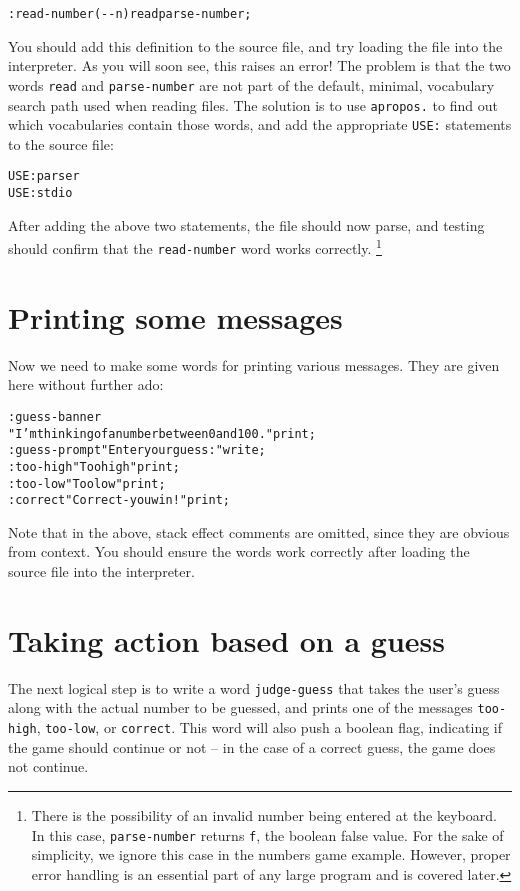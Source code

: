 \documentclass[english]{book}
\begin{document}
\begin{alltt}
: read-number ( -{}- n ) read parse-number ;
\end{alltt}
You should add this definition to the source file, and try loading
the file into the interpreter. As you will soon see, this raises an
error! The problem is that the two words \texttt{read} and \texttt{parse-number}
are not part of the default, minimal, vocabulary search path used
when reading files. The solution is to use \texttt{apropos.} to find
out which vocabularies contain those words, and add the appropriate
\texttt{USE:} statements to the source file:

\begin{alltt}
USE: parser
USE: stdio
\end{alltt}
After adding the above two statements, the file should now parse,
and testing should confirm that the \texttt{read-number} word works correctly.%
\footnote{There is the possibility of an invalid number being entered at the
keyboard. In this case, \texttt{parse-number} returns \texttt{f},
the boolean false value. For the sake of simplicity, we ignore this
case in the numbers game example. However, proper error handling is
an essential part of any large program and is covered later.%
}


\section{Printing some messages}

Now we need to make some words for printing various messages. They
are given here without further ado:

\begin{alltt}
: guess-banner
    "I'm thinking of a number between 0 and 100." print ;
: guess-prompt "Enter your guess: " write ;
: too-high "Too high" print ;
: too-low "Too low" print ;
: correct "Correct - you win!" print ;
\end{alltt}
Note that in the above, stack effect comments are omitted, since they
are obvious from context. You should ensure the words work correctly
after loading the source file into the interpreter.


\section{Taking action based on a guess}

The next logical step is to write a word \texttt{judge-guess} that
takes the user's guess along with the actual number to be guessed,
and prints one of the messages \texttt{too-high}, \texttt{too-low},
or \texttt{correct}. This word will also push a boolean flag, indicating
if the game should continue or not -- in the case of a correct guess,
the game does not continue.
\end{document}
